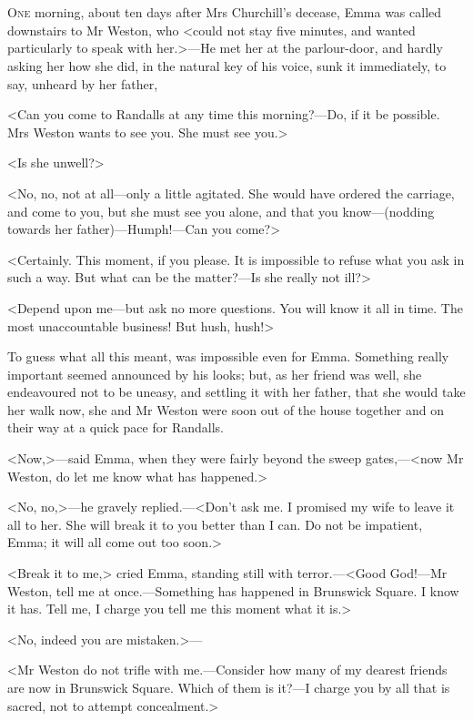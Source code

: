 \chapter[Chapter \thechapter]{}
\lettrine[lraise=0.3]{O}{ne} morning, about ten days after Mrs Churchill's decease, Emma was called downstairs to Mr Weston, who <could not stay five minutes, and wanted particularly to speak with her.>—He met her at the parlour-door, and hardly asking her how she did, in the natural key of his voice, sunk it immediately, to say, unheard by her father,

<Can you come to Randalls at any time this morning?—Do, if it be possible. Mrs Weston wants to see you. She must see you.>

<Is she unwell?>

<No, no, not at all—only a little agitated. She would have ordered the carriage, and come to you, but she must see you alone, and that you know—(nodding towards her father)—Humph!—Can you come?>

<Certainly. This moment, if you please. It is impossible to refuse what you ask in such a way. But what can be the matter?—Is she really not ill?>

<Depend upon me—but ask no more questions. You will know it all in time. The most unaccountable business! But hush, hush!>

To guess what all this meant, was impossible even for Emma. Something really important seemed announced by his looks; but, as her friend was well, she endeavoured not to be uneasy, and settling it with her father, that she would take her walk now, she and Mr Weston were soon out of the house together and on their way at a quick pace for Randalls.

<Now,>—said Emma, when they were fairly beyond the sweep gates,—<now Mr Weston, do let me know what has happened.>

<No, no,>—he gravely replied.—<Don't ask me. I promised my wife to leave it all to her. She will break it to you better than I can. Do not be impatient, Emma; it will all come out too soon.>

<Break it to me,> cried Emma, standing still with terror.—<Good God!—Mr Weston, tell me at once.—Something has happened in Brunswick Square. I know it has. Tell me, I charge you tell me this moment what it is.>

<No, indeed you are mistaken.>—

<Mr Weston do not trifle with me.—Consider how many of my dearest friends are now in Brunswick Square. Which of them is it?—I charge you by all that is sacred, not to attempt concealment.>

